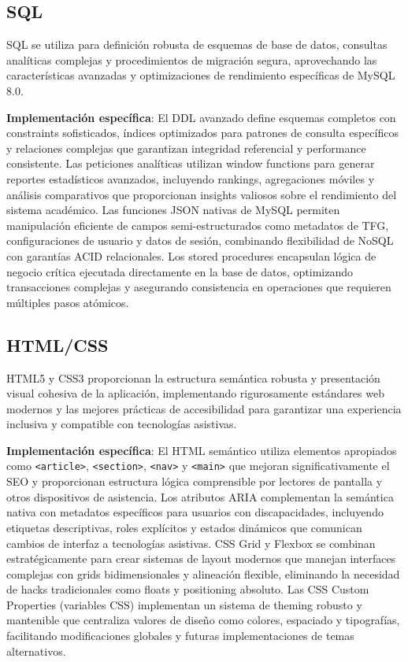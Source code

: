 \documentclass[12pt,a4paper,oneside]{report}
\begin{document}
\subsection{SQL}\label{sql}

SQL se utiliza para definición robusta de esquemas de base de datos, consultas analíticas complejas y procedimientos de migración segura, aprovechando las características avanzadas y optimizaciones de rendimiento específicas de MySQL 8.0.

\textbf{Implementación específica}: El DDL avanzado define esquemas completos con constraints sofisticados, índices optimizados para patrones de consulta específicos y relaciones complejas que garantizan integridad referencial y performance consistente. Las peticiones analíticas utilizan window functions para generar reportes estadísticos avanzados, incluyendo rankings, agregaciones móviles y análisis comparativos que proporcionan insights valiosos sobre el rendimiento del sistema académico. Las funciones JSON nativas de MySQL permiten manipulación eficiente de campos semi-estructurados como metadatos de TFG, configuraciones de usuario y datos de sesión, combinando flexibilidad de NoSQL con garantías ACID relacionales. Los stored procedures encapsulan lógica de negocio crítica ejecutada directamente en la base de datos, optimizando transacciones complejas y asegurando consistencia en operaciones que requieren múltiples pasos atómicos.

\subsection{HTML/CSS}\label{htmlcss}

HTML5 y CSS3 proporcionan la estructura semántica robusta y presentación visual cohesiva de la aplicación, implementando rigurosamente estándares web modernos y las mejores prácticas de accesibilidad para garantizar una experiencia inclusiva y compatible con tecnologías asistivas.

\textbf{Implementación específica}: El HTML semántico utiliza elementos apropiados como \texttt{<article>}, \texttt{<section>}, \texttt{<nav>} y \texttt{<main>} que mejoran significativamente el SEO y proporcionan estructura lógica comprensible por lectores de pantalla y otros dispositivos de asistencia. Los atributos ARIA complementan la semántica nativa con metadatos específicos para usuarios con discapacidades, incluyendo etiquetas descriptivas, roles explícitos y estados dinámicos que comunican cambios de interfaz a tecnologías asistivas. CSS Grid y Flexbox se combinan estratégicamente para crear sistemas de layout modernos que manejan interfaces complejas con grids bidimensionales y alineación flexible, eliminando la necesidad de hacks tradicionales como floats y positioning absoluto. Las CSS Custom Properties (variables CSS) implementan un sistema de theming robusto y mantenible que centraliza valores de diseño como colores, espaciado y tipografías, facilitando modificaciones globales y futuras implementaciones de temas alternativos.
\end{document}
